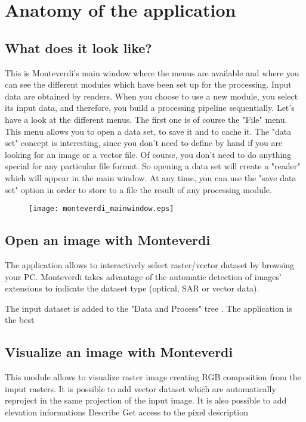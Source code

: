 \documentclass{InsightSoftwareGuide}
\begin{document}
 
\chapter{Anatomy of the application}
\section{What does it look like?}
This is Monteverdi's main window where the menus are available and where you can see the different modules which have been 
set up for the processing. Input data are obtained by readers. When you choose to use a new module, you select its input data,
 and therefore, you build a processing pipeline sequentially. Let's have a look at the different menus. The first one is of
 course the "File" menu. This menu allows you to open a data set, to save it and to cache it. The "data set" concept is
 interesting, since you don't need to define by hand if you are looking for an image or a vector file. Of course, 
you don't need to do anything special for any particular file format. So opening a data set will create a "reader" 
which will appear in the main window. At any time, you can use the "save data set" option in order to store to a 
file the result of any processing module.

\begin{figure}
   \center
   \texttt{[image: monteverdi\_mainwindow.eps]}
   \label{fig:MeanImageFilterOutput}
   \end{figure}


\section{Open an image with Monteverdi}
The application allows to interactively select raster/vector dataset by browsing your PC. Monteverdi takes
advantage of the automatic detection of images' extensions to indicate the dataset type (optical, SAR or vector data).   

The input dataset is added to the "Data and Process" tree . The application is the best

\section{Visualize an image with Monteverdi}
This module allows to visualize raster image creating RGB composition from the imput rasters. It is possible to add 
vector dataset which are automatically reproject in the same projection of the input image. 
It is also possible to add elevation informations 
Describe Get access to the pixel description
\end{document}
